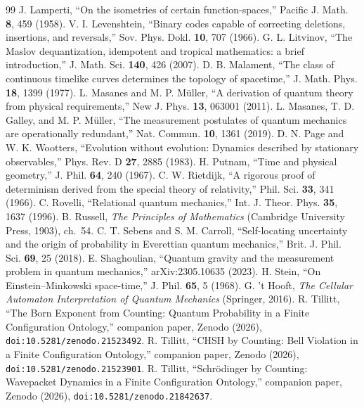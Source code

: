 \documentclass[11pt]{article}
\theoremstyle{definition}
\theoremstyle{remark}
\begin{document}
\begin{thebibliography}{99}
 J. Lamperti, ``On the isometries of certain function-spaces,'' Pacific J. Math. \textbf{8}, 459 (1958).
 V. I. Levenshtein, ``Binary codes capable of correcting deletions, insertions, and reversals,'' Sov. Phys. Dokl. \textbf{10}, 707 (1966).
 G. L. Litvinov, ``The Maslov dequantization, idempotent and tropical mathematics: a brief introduction,'' J. Math. Sci. \textbf{140}, 426 (2007).
 D. B. Malament, ``The class of continuous timelike curves determines the topology of spacetime,'' J. Math. Phys. \textbf{18}, 1399 (1977).
 L. Masanes and M. P. M\"uller, ``A derivation of quantum theory from physical requirements,'' New J. Phys. \textbf{13}, 063001 (2011).
 L. Masanes, T. D. Galley, and M. P. M\"uller, ``The measurement postulates of quantum mechanics are operationally redundant,'' Nat. Commun. \textbf{10}, 1361 (2019).
 D. N. Page and W. K. Wootters, ``Evolution without evolution: Dynamics described by stationary observables,'' Phys. Rev. D \textbf{27}, 2885 (1983).
 H. Putnam, ``Time and physical geometry,'' J. Phil. \textbf{64}, 240 (1967).
 C. W. Rietdijk, ``A rigorous proof of determinism derived from the special theory of relativity,'' Phil. Sci. \textbf{33}, 341 (1966).
 C. Rovelli, ``Relational quantum mechanics,'' Int. J. Theor. Phys. \textbf{35}, 1637 (1996).
 B. Russell, \emph{The Principles of Mathematics} (Cambridge University Press, 1903), ch.~54.
 C. T. Sebens and S. M. Carroll, ``Self-locating uncertainty and the origin of probability in Everettian quantum mechanics,'' Brit. J. Phil. Sci. \textbf{69}, 25 (2018).
 E. Shaghoulian, ``Quantum gravity and the measurement problem in quantum mechanics,'' arXiv:2305.10635 (2023).
 H. Stein, ``On Einstein--Minkowski space-time,'' J. Phil. \textbf{65}, 5 (1968).
 G. 't Hooft, \emph{The Cellular Automaton Interpretation of Quantum Mechanics} (Springer, 2016).
 R. Tillitt, ``The Born Exponent from Counting: Quantum Probability in a Finite Configuration Ontology,'' companion paper, Zenodo (2026), \texttt{doi:10.5281/zenodo.21523492}.
 R. Tillitt, ``CHSH by Counting: Bell Violation in a Finite Configuration Ontology,'' companion paper, Zenodo (2026), \texttt{doi:10.5281/zenodo.21523901}.
 R. Tillitt, ``Schr\"odinger by Counting: Wavepacket Dynamics in a Finite Configuration Ontology,'' companion paper, Zenodo (2026), \texttt{doi:10.5281/zenodo.21842637}.

\end{thebibliography}
\end{document}

